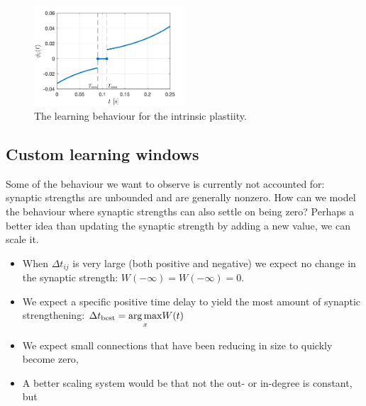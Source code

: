 \begin{figure}[H]
\centering
\includegraphics[width = 0.5\textwidth]{../Figures/IPlearningFunction.png}
\caption{The learning behaviour for the intrinsic plastiity.}
\label{fig:IPlearningFunction}
\end{figure}



\subsection{Custom learning windows}
Some of the behaviour we want to observe is currently not accounted for: synaptic strengths are unbounded and are generally nonzero. How can we model the behaviour where synaptic strengths can also settle on being zero? Perhaps a better idea than updating the synaptic strength by adding a new value, we can scale it.
\begin{itemize}
\item When $\Delta t_{ij}$ is very large (both positive and negative) we expect no change in the synaptic strength: $W(-\infty) = W(-\infty) = 0$. 
\item We expect a specific positive time delay to yield the most amount of synaptic strengthening: $\Delta t_{\rm best} = \underset{x}{\arg \max}  W(t)$
\item We expect small connections that have been reducing in size to quickly become zero, 
\item A better scaling system would be that not the out- or in-degree is constant, but 
\end{itemize}




\small{}

\label{LastPage}~


